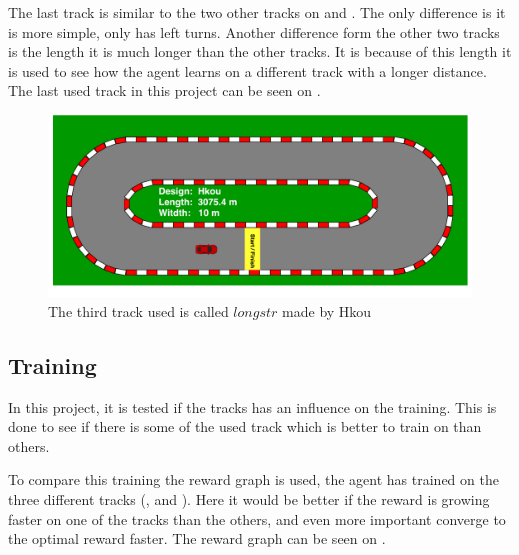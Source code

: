 The last track is similar to the two other tracks on  and . The only difference is it is more simple, only has left turns. Another difference form the other two tracks is the length it is much longer than the other tracks. It is because of this length it is used to see how the agent learns on a different track with a longer distance. The last used track in this project can be seen on . 

\begin{figure}[H]
	\centering
	\includegraphics[width=1\textwidth]{Figures/Result/track_longstr.pdf}
	\caption{The third track used is called $longstr$ made by Hkou}
	\label{fig:track_longstr}
\end{figure}


\subsection*{Training}
In this project, it is tested if the tracks has an influence on the training. This is done to see if there is some of the used track which is better to train on than others.

To compare this training the reward graph is used, the agent has trained on the three different tracks (,  and ). Here it would be better if the reward is growing faster on one of the tracks than the others, and even more important converge to the optimal reward faster. The reward graph can be seen on .

